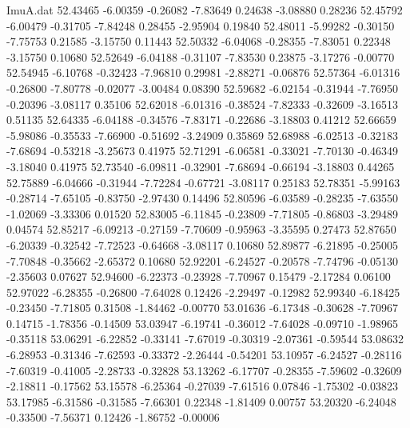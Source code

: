 \begin{filecontents}{ImuA.dat}
  52.43465   -6.00359   -0.26082   -7.83649    0.24638   -3.08880    0.28236
  52.45792   -6.00479   -0.31705   -7.84248    0.28455   -2.95904    0.19840
  52.48011   -5.99282   -0.30150   -7.75753    0.21585   -3.15750    0.11443
  52.50332   -6.04068   -0.28355   -7.83051    0.22348   -3.15750    0.10680
  52.52649   -6.04188   -0.31107   -7.83530    0.23875   -3.17276   -0.00770
  52.54945   -6.10768   -0.32423   -7.96810    0.29981   -2.88271   -0.06876
  52.57364   -6.01316   -0.26800   -7.80778   -0.02077   -3.00484    0.08390
  52.59682   -6.02154   -0.31944   -7.76950   -0.20396   -3.08117    0.35106
  52.62018   -6.01316   -0.38524   -7.82333   -0.32609   -3.16513    0.51135
  52.64335   -6.04188   -0.34576   -7.83171   -0.22686   -3.18803    0.41212
  52.66659   -5.98086   -0.35533   -7.66900   -0.51692   -3.24909    0.35869
  52.68988   -6.02513   -0.32183   -7.68694   -0.53218   -3.25673    0.41975
  52.71291   -6.06581   -0.33021   -7.70130   -0.46349   -3.18040    0.41975
  52.73540   -6.09811   -0.32901   -7.68694   -0.66194   -3.18803    0.44265
  52.75889   -6.04666   -0.31944   -7.72284   -0.67721   -3.08117    0.25183
  52.78351   -5.99163   -0.28714   -7.65105   -0.83750   -2.97430    0.14496
  52.80596   -6.03589   -0.28235   -7.63550   -1.02069   -3.33306    0.01520
  52.83005   -6.11845   -0.23809   -7.71805   -0.86803   -3.29489    0.04574
  52.85217   -6.09213   -0.27159   -7.70609   -0.95963   -3.35595    0.27473
  52.87650   -6.20339   -0.32542   -7.72523   -0.64668   -3.08117    0.10680
  52.89877   -6.21895   -0.25005   -7.70848   -0.35662   -2.65372    0.10680
  52.92201   -6.24527   -0.20578   -7.74796   -0.05130   -2.35603    0.07627
  52.94600   -6.22373   -0.23928   -7.70967    0.15479   -2.17284    0.06100
  52.97022   -6.28355   -0.26800   -7.64028    0.12426   -2.29497   -0.12982
  52.99340   -6.18425   -0.23450   -7.71805    0.31508   -1.84462   -0.00770
  53.01636   -6.17348   -0.30628   -7.70967    0.14715   -1.78356   -0.14509
  53.03947   -6.19741   -0.36012   -7.64028   -0.09710   -1.98965   -0.35118
  53.06291   -6.22852   -0.33141   -7.67019   -0.30319   -2.07361   -0.59544
  53.08632   -6.28953   -0.31346   -7.62593   -0.33372   -2.26444   -0.54201
  53.10957   -6.24527   -0.28116   -7.60319   -0.41005   -2.28733   -0.32828
  53.13262   -6.17707   -0.28355   -7.59602   -0.32609   -2.18811   -0.17562
  53.15578   -6.25364   -0.27039   -7.61516    0.07846   -1.75302   -0.03823
  53.17985   -6.31586   -0.31585   -7.66301    0.22348   -1.81409    0.00757
  53.20320   -6.24048   -0.33500   -7.56371    0.12426   -1.86752   -0.00006

\end{filecontents}
